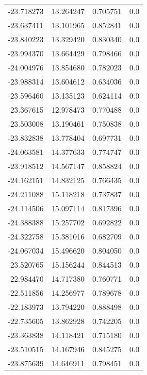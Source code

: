 \begin{tabular}{rrrr}
      -23.718273 &        13.264247 &    0.705751 &   0.0 \\
      -23.637411 &        13.101965 &    0.852841 &   0.0 \\
      -23.840223 &        13.329420 &    0.830340 &   0.0 \\
      -23.994370 &        13.664429 &    0.798466 &   0.0 \\
      -24.004976 &        13.854680 &    0.782023 &   0.0 \\
      -23.988314 &        13.604612 &    0.634036 &   0.0 \\
      -23.596460 &        13.135123 &    0.624114 &   0.0 \\
      -23.367615 &        12.978473 &    0.770488 &   0.0 \\
      -23.503008 &        13.190461 &    0.750838 &   0.0 \\
      -23.832838 &        13.778404 &    0.697731 &   0.0 \\
      -24.063581 &        14.377633 &    0.774747 &   0.0 \\
      -23.918512 &        14.567147 &    0.858824 &   0.0 \\
      -24.162151 &        14.832125 &    0.766435 &   0.0 \\
      -24.211088 &        15.118218 &    0.737837 &   0.0 \\
      -24.114506 &        15.097114 &    0.817396 &   0.0 \\
      -24.388388 &        15.257702 &    0.692822 &   0.0 \\
      -24.322758 &        15.381016 &    0.682709 &   0.0 \\
      -24.067034 &        15.496620 &    0.804050 &   0.0 \\
      -23.520765 &        15.156244 &    0.844513 &   0.0 \\
      -22.984470 &        14.717380 &    0.760771 &   0.0 \\
      -22.511856 &        14.256977 &    0.789678 &   0.0 \\
      -22.183973 &        13.794220 &    0.888498 &   0.0 \\
      -22.735605 &        13.862928 &    0.742205 &   0.0 \\
      -23.363838 &        14.118421 &    0.715180 &   0.0 \\
      -23.510515 &        14.167946 &    0.845275 &   0.0 \\
      -23.875639 &        14.646911 &    0.798451 &   0.0 \\

\end{tabular}

